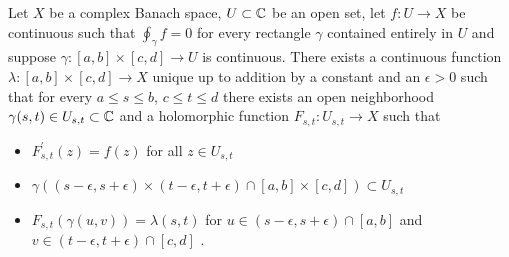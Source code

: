 \begin{prop}\label{banach:HolomorphicPrimitiveOnRectangle}Let $X$ be a complex Banach space, $U \subset \mathbb{C}$ be an open set, let $f: U \to X$ be continuous such that $\oint_\gamma f = 0$ for every rectangle $\gamma$ contained entirely in $U$ and suppose $\gamma : [a,b] \times [c,d] \to U$ is continuous.   There exists a continuous function $\lambda : [a,b] \times [c,d] \to X$ unique up to addition by a constant and an $\epsilon>0$ such that for every $a \leq s \leq b$,  $c \leq t \leq d$ there exists an open neighborhood $\gamma(s,t) \in U_{s,t}\subset \mathbb{C}$ and a holomorphic function $F_{s,t} : U_{s,t} \to X$ such that 
  \begin{itemize}
  \item[(i)] $F_{s,t}^{\prime}(z) = f(z)$ for all  $z \in U_{s,t}$
  \item[(ii)] $\gamma((s - \epsilon, s + \epsilon) \times (t - \epsilon,    t+\epsilon) \cap [a,b] \times [c,d]) \subset U_{s,t}$ 
  \item[(iii)] $F_{s,t}(\gamma(u,v)) = \lambda(s,t)$ for $u \in (s - \epsilon, s + \epsilon) \cap [a,b]$ and $v \in (t - \epsilon, t + \epsilon) \cap [c,d]$ .
  \end{itemize}
\end{prop}
